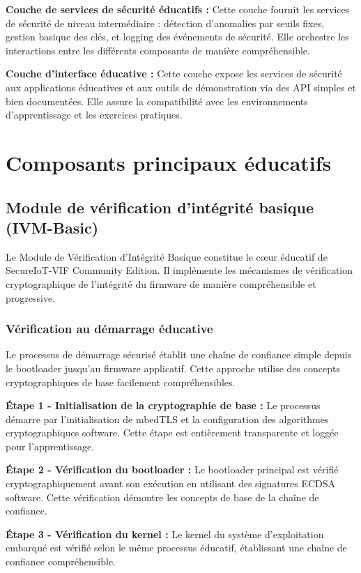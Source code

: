 \textbf{Couche de services de sécurité éducatifs :} Cette couche fournit les services de sécurité de niveau intermédiaire : détection d'anomalies par seuils fixes, gestion basique des clés, et logging des événements de sécurité. Elle orchestre les interactions entre les différents composants de manière compréhensible.

\textbf{Couche d'interface éducative :} Cette couche expose les services de sécurité aux applications éducatives et aux outils de démonstration via des API simples et bien documentées. Elle assure la compatibilité avec les environnements d'apprentissage et les exercices pratiques.

\section{Composants principaux éducatifs}

\subsection{Module de vérification d'intégrité basique (IVM-Basic)}

Le Module de Vérification d'Intégrité Basique constitue le cœur éducatif de SecureIoT-VIF Community Edition. Il implémente les mécanismes de vérification cryptographique de l'intégrité du firmware de manière compréhensible et progressive.

\subsubsection{Vérification au démarrage éducative}

Le processus de démarrage sécurisé établit une chaîne de confiance simple depuis le bootloader jusqu'au firmware applicatif. Cette approche utilise des concepts cryptographiques de base facilement compréhensibles.

\textbf{Étape 1 - Initialisation de la cryptographie de base :} Le processus démarre par l'initialisation de mbedTLS et la configuration des algorithmes cryptographiques software. Cette étape est entièrement transparente et loggée pour l'apprentissage.

\textbf{Étape 2 - Vérification du bootloader :} Le bootloader principal est vérifié cryptographiquement avant son exécution en utilisant des signatures ECDSA software. Cette vérification démontre les concepts de base de la chaîne de confiance.

\textbf{Étape 3 - Vérification du kernel :} Le kernel du système d'exploitation embarqué est vérifié selon le même processus éducatif, établissant une chaîne de confiance compréhensible.

